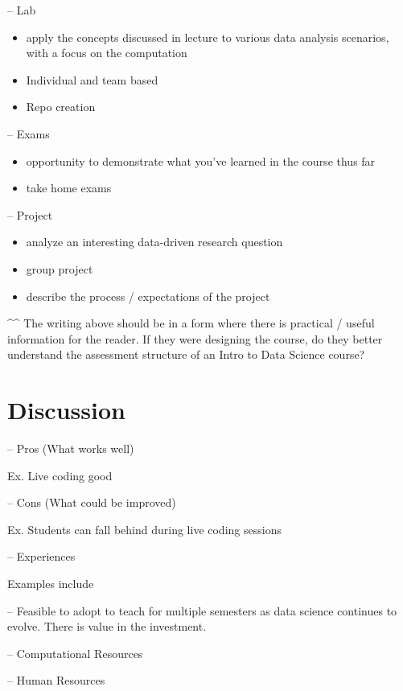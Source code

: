 \documentclass[
  12pt]{article}
\begin{document}
-- Lab

\begin{itemize}
\item
  apply the concepts discussed in lecture to various data analysis
  scenarios, with a focus on the computation
\item
  Individual and team based
\item
  Repo creation
\end{itemize}

-- Exams

\begin{itemize}
\item
  opportunity to demonstrate what you've learned in the course thus far
\item
  take home exams
\end{itemize}

-- Project

\begin{itemize}
\item
  analyze an interesting data-driven research question
\item
  group project
\item
  describe the process / expectations of the project
\end{itemize}

\^{}\^{} The writing above should be in a form where there is practical
/ useful information for the reader. If they were designing the course,
do they better understand the assessment structure of an Intro to Data
Science course?

\hypertarget{discussion}{%
\section{Discussion}\label{discussion}}

-- Pros (What works well)

Ex. Live coding good

-- Cons (What could be improved)

Ex. Students can fall behind during live coding sessions

-- Experiences

Examples include

-- Feasible to adopt to teach for multiple semesters as data science
continues to evolve. There is value in the investment.

-- Computational Resources

-- Human Resources

\newpage


  
\end{document}
